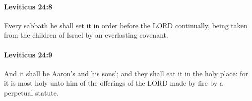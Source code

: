 		\paragraph{Leviticus 24:8} %
			\label{LEVITICUS-24-8}

			Every sabbath he shall set it in order before the LORD continually, being taken from the children of Israel by an everlasting covenant.


		\paragraph{Leviticus 24:9} %
			\label{LEVITICUS-24-9}

			And it shall be Aaron’s and his sons’; and they shall eat it in the holy place: for it is most holy unto him of the offerings of the LORD made by fire by a perpetual statute.


